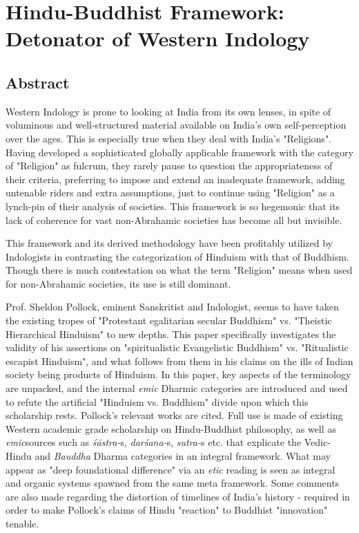 
\chapter{Hindu-Buddhist Framework: Detonator of Western Indology}\label{chapter3}

\setcounter{endnote}{0}



\section*{Abstract}

Western Indology is prone to looking at India from its own lenses, in spite of voluminous and well-structured material available on India's own self-perception over the ages. This is especially true when they deal with India's "Religions". Having developed a sophisticated globally applicable framework with the category of "Religion" as fulcrum, they rarely pause to question the appropriateness of their criteria, preferring to impose and extend an inadequate framework, adding untenable riders and extra assumptions, just to continue using "Religion" as a lynch-pin of their analysis of societies. This framework is so hegemonic that its lack of coherence for vast non-Abrahamic societies has become all but invisible.

This framework and its derived methodology have been profitably utilized by Indologists in contrasting the categorization of Hinduism with that of Buddhism. Though there is much contestation on what the term "Religion" means when used for non-Abrahamic societies, its use is still dominant.

\newpage

Prof. Sheldon Pollock, eminent Sanskritist and Indologist, seems to have taken the existing tropes of "Protestant egalitarian secular Buddhism" vs. "Theistic Hierarchical Hinduism" to new depths. This paper specifically investigates the validity of his assertions on "spiritualistic Evangelistic Buddhism" vs. "Ritualistic escapist Hinduism", and what follows from them in his claims on the ills of Indian society being products of Hinduism. In this paper, key aspects of the terminology are unpacked, and the internal \textit{emic} Dharmic categories are introduced and used to refute the artificial "Hinduism vs. Buddhism" divide upon which this scholarship rests. Pollock's relevant works are cited. Full use is made of existing Western academic grade scholarship on Hindu-Buddhist philosophy, as well as \textit{emic}sources such as \textit{śāstra-}s, \textit{darśana-}s, \textit{sutra-}s etc. that explicate the Vedic-Hindu and \textit{Bauddha} Dharma categories in an integral framework. What may appear as "deep foundational difference" via an \textit{etic} reading is seen as integral and organic systems spawned from the same meta framework. Some comments are also made regarding the distortion of timelines of India's history - required in order to make Pollock's claims of Hindu "reaction" to Buddhist "innovation" tenable.


